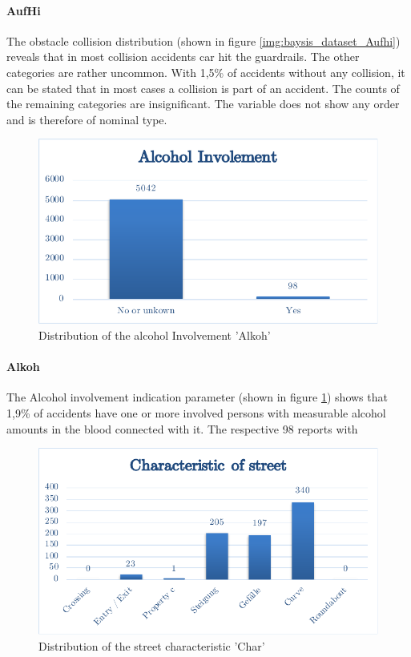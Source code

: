 \documentclass[a4paper,12pt]{report}
\begin{document}
\paragraph{AufHi}
The obstacle collision distribution (shown in figure \ref{img:baysis_dataset_Aufhi}) reveals that in most collision accidents car hit the guardrails. The other categories are rather uncommon. With 1,5\% of accidents without any collision, it can be stated that in most cases a collision is part of an accident. The counts of the remaining categories are insignificant. The variable does not show any order and is therefore of nominal type.

\begin{figure}[h]
	\centering
	\includegraphics[scale=0.6]{./assets/baysis_dataset_Alkoh.pdf}
	\caption{Distribution of the alcohol Involvement 'Alkoh'}
	\label{img:baysis_dataset_Alkoh}
\end{figure}

\paragraph{Alkoh}
The Alcohol involvement indication parameter (shown in figure \ref{img:baysis_dataset_Alkoh}) shows that 1,9\% of accidents have one or more involved persons with measurable alcohol amounts in the blood connected with it. The respective 98 reports with 

\begin{figure}[h]
	\centering
	\includegraphics[scale=0.6]{./assets/baysis_dataset_Char.pdf}
	\caption{Distribution of the street characteristic 'Char'}
	\label{img:baysis_dataset_Char}
\end{figure}
\end{document}
